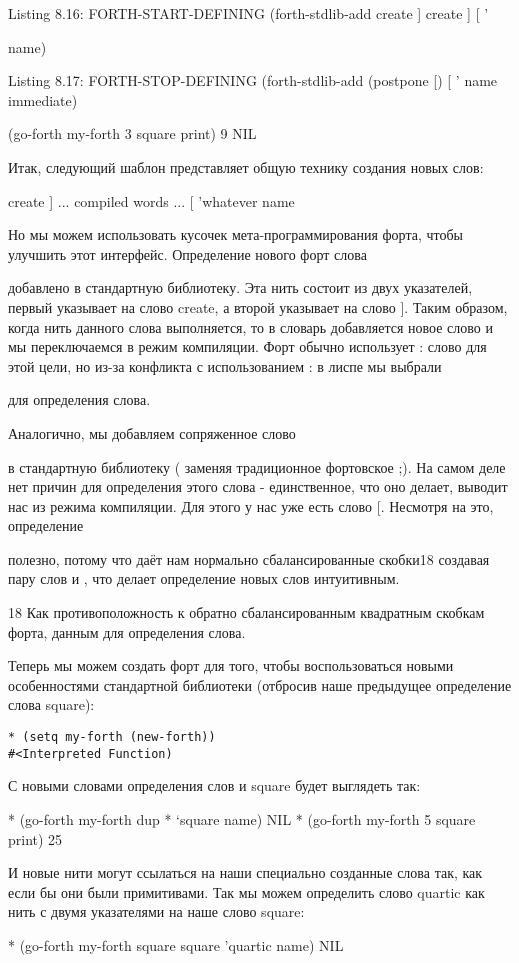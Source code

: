 Listing 8.16: FORTH-START-DEFINING
(forth-stdlib-add
create
] create ] [
’{ name)

Listing 8.17: FORTH-STOP-DEFINING
(forth-stdlib-add
{ (postpone [) [
’} name immediate)

(go-forth my-forth
3 square print)
9
NIL

Итак, следующий шаблон представляет общую технику создания новых слов:

create
] ... compiled words ... [
’whatever name

Но мы можем использовать кусочек мета-программирования форта, чтобы улучшить этот интерфейс. Определение  нового форт слова { добавлено в стандартную библиотеку. Эта нить состоит из двух указателей, первый указывает на слово create, а второй указывает на слово ]. Таким образом, когда нить данного слова выполняется, то в словарь добавляется новое слово и мы переключаемся в режим компиляции. Форт обычно использует : слово для этой цели, но из-за конфликта с использованием : в лиспе мы выбрали { для определения слова.

Аналогично, мы добавляем сопряженное слово } в стандартную библиотеку ( заменяя традиционное фортовское ;). На самом деле нет причин для определения этого слова - единственное, что оно делает, выводит нас из режима компиляции. Для этого у нас уже есть слово [. Несмотря на это, определение { полезно, потому что даёт нам нормально сбалансированные скобки18 создавая пару слов { и }, что делает определение новых слов интуитивным.

18 Как противоположность к обратно сбалансированным квадратным скобкам форта, данным для определения слова.

Теперь мы можем создать форт для того, чтобы воспользоваться новыми особенностями стандартной библиотеки (отбросив наше предыдущее определение слова square):

\begin{verbatim}
* (setq my-forth (new-forth))
#<Interpreted Function)
\end{verbatim}

С новыми словами определения слов { и } square будет выглядеть так:

* (go-forth my-forth
{ dup * } ‘square name)
NIL
* (go-forth my-forth
5 square print)
25

И новые нити могут ссылаться на наши специально созданные слова так, как если бы они были примитивами. Так мы можем определить слово quartic как нить с двумя указателями на наше слово square:

* (go-forth my-forth
{ square square } ’quartic name)
NIL

}}}
